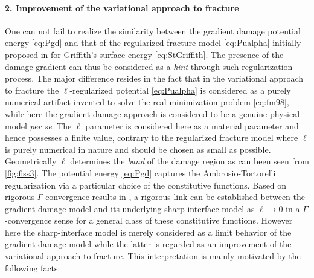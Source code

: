 \paragraph{2. Improvement of the variational approach to fracture} One can not fail to realize the similarity between the gradient damage potential energy \eqref{eq:Pgd} and that of the regularized fracture model \eqref{eq:Pualpha} initially proposed in \cite{BourdinFrancfortMarigo:2000} for Griffith's surface energy \eqref{eq:StGriffith}. The presence of the damage gradient can thus be considered as a \emph{hint} through such regularization process. The major difference resides in the fact that in the variational approach to fracture the $\ell$-regularized potential \eqref{eq:Pualpha} is considered as a purely numerical artifact invented to solve the real minimization problem \eqref{eq:fm98}, while here the gradient damage approach is considered to be a genuine physical model \emph{per se}. The $\ell$ parameter is considered here as a material parameter and hence possesses a finite value, contrary to the regularized fracture model where $\ell$ is purely numerical in nature and should be chosen as small as possible. Geometrically $\ell$ determines the \emph{band} of the damage region as can been seen from \cref{fig:fiss3}. The potential energy \eqref{eq:Pgd} captures the Ambrosio-Tortorelli regularization via a particular choice of the constitutive functions. Based on rigorous $\Gamma$-convergence results in \cite{Braides:2002}, a rigorous link can be established between the gradient damage model and its underlying sharp-interface model as $\ell\to 0$ in a $\Gamma$-convergence sense for a general class of these constitutive functions. However here the sharp-interface model is merely considered as a limit behavior of the gradient damage model while the latter is regarded as an improvement of the variational approach to fracture. This interpretation is mainly motivated by the following facts:
